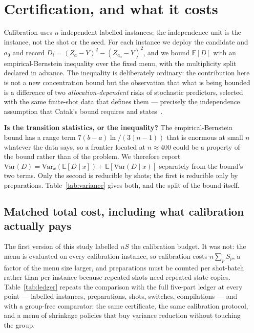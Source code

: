 \documentclass{article}
\begin{document}
\section{Certification, and what it costs}
\label{sec:certify_hist}

Calibration uses $n$ independent labelled instances; the independence unit is the instance, not the
shot or the seed. For each instance we deploy the candidate and $a_0$ and record
$D_i=(Z_a-Y)^2-(Z_{a_0}-Y)^2$, and we bound $\mathbb{E}[D]$ with an empirical-Bernstein inequality
over the fixed menu, with the multiplicity split declared in advance. The inequality is deliberately
ordinary: the contribution here is not a new concentration bound but the observation that what is
being bounded is a difference of two \emph{allocation-dependent} risks of stochastic predictors,
selected with the same finite-shot data that defines them --- precisely the independence assumption
that Catak's bound requires and states~\citep{catak2026budget}.



\textbf{Is the transition statistics, or the inequality?} The empirical-Bernstein bound has a range
term $7(b-a)\ln/(3(n-1))$ that is enormous at small $n$ whatever the data says, so a frontier located
at $n\approx 400$ could be a property of the bound rather than of the problem. We therefore report
$\mathrm{Var}(D)=\mathrm{Var}_x(\mathbb{E}[D\mid x])+\mathbb{E}[\mathrm{Var}(D\mid x)]$ separately from
the bound's two terms. Only the second is reducible by shots; the first is reducible only by
preparations. Table~\ref{tab:variance} gives both, and the split of the bound itself.



\subsection{Matched total cost, including what calibration actually pays}
\label{sec:ledger_hist}
The first version of this study labelled $nS$ the calibration budget. It was not: the menu is
evaluated on every calibration instance, so calibration costs $n\sum_p S_p$, a factor of the menu
size larger, and preparations must be counted per shot-batch rather than per instance because repeated
shots need repeated state copies. Table~\ref{tab:ledger} repeats the comparison with the full five-part
ledger at every point --- labelled instances, preparations, shots, switches, compilations --- and with
a group-free comparator: the same certificate, the same calibration protocol, and a menu of shrinkage
policies that buy variance reduction without touching the group.
\end{document}
